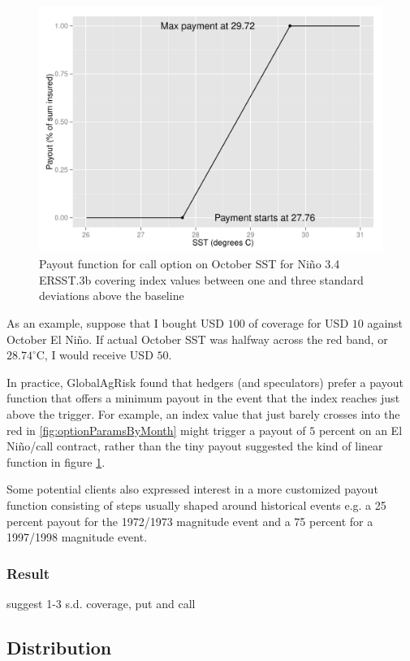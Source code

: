 \documentclass[authoryear]{article}
\begin{document}
\begin{figure}[!htbp]
  \includegraphics[width=\linewidth]{Pricingfigs/payoutExamplemonth10contractType1}
  \caption{Payout function for call option on October SST for Ni\~no 3.4 ERSST.3b covering index values between one and three standard deviations above the baseline}
   \label{fig:payouyt10callex}
\end{figure}

As an example, suppose that I bought USD $100$ of coverage for USD $10$ against October El Ni\~no. If actual October SST was halfway across the red band, or $28.74^{\circ}\mathrm{C}$, I would receive USD $50$.

In practice, GlobalAgRisk found that hedgers (and speculators) prefer a payout function that offers a minimum payout in the event that the index reaches just above the trigger. For example, an index value that just barely crosses into the red in \ref{fig:optionParamsByMonth} might trigger a payout of $5$ percent on an El Ni\~no/call contract, rather than the tiny payout suggested the kind of linear function in figure \ref{fig:payouyt10callex}.

Some potential clients also expressed interest in a more customized payout function consisting of steps usually shaped around historical events e.g. a 25 percent payout for the 1972/1973 magnitude event and a 75 percent for a 1997/1998 magnitude event.
\subsubsection{Result}
suggest 1-3 s.d. coverage, put and call

\subsection{Distribution}
\end{document}

